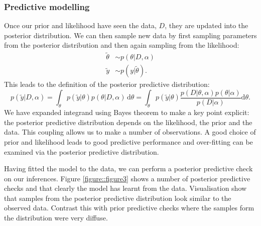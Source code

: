 \documentclass[12pt,english, journal=jpr, layout=twocolumn]{article}
\begin{document}
\subsubsection{Predictive modelling}
Once our prior and likelihood have seen the data, $D$, they are updated into the posterior distribution. We can then sample new data by first sampling parameters from the posterior distribution and then again sampling from the likelihood:
\begin{equation}
	\begin{split}
		\tilde{\theta} &\sim p(\theta|D, \alpha) \\
		\tilde{y} & \sim p(y|\tilde{\theta}).
	\end{split}
\end{equation}  
This leads to the definition of the posterior predictive distribution:
\begin{equation}
	p(\tilde{y}|D, \alpha) = \int_{\theta} p(\tilde{y}|\theta)p(\theta|D, \alpha)\, \text{d}\theta = \int_{\theta}p(\tilde{y}|\theta) \frac{p(D|\theta, \alpha)p(\theta|\alpha)}{p(D|\alpha)} \text{d}\theta.
\end{equation}
We have expanded integrand using Bayes theorem to make a key point explicit: the posterior predictive distribution depends on the likelihood, the prior and the data. This coupling allows us to make a number of observations. A good choice of prior and likelihood leads to good predictive performance and over-fitting can be examined via the posterior predictive distribution. 

Having fitted the model to the data, we can perform a posterior predictive check on our inferences. Figure \ref{figure::figure3} shows a number of posterior predictive checks and that clearly the model has learnt from the data. Visualisation show that samples from the posterior predictive distribution look similar to the observed data. Contrast this with prior predictive checks where the samples form the distribution were very diffuse.
\end{document}
